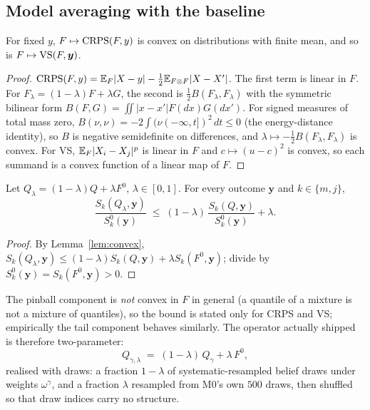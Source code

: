\subsection{Model averaging with the baseline}

\begin{lemma}\label{lem:convex}
For fixed $y$, $F\mapsto\operatorname{CRPS}(F,y)$ is convex on distributions with finite mean, and so is $F\mapsto\operatorname{VS}(F,\bm y)$.
\end{lemma}
\begin{proof}
$\operatorname{CRPS}(F,y)=\mathbb{E}_F|X-y|-\frac12\mathbb{E}_{F\otimes F}|X-X'|$. The first term is linear in $F$. For $F_\lambda=(1-\lambda)F+\lambda G$, the second is
$\frac12 B(F_\lambda,F_\lambda)$ with the symmetric bilinear form $B(F,G)=\iint|x-x'|F(dx)G(dx')$. For signed measures of total mass zero,
$B(\nu,\nu)=-2\int(\nu(-\infty,t])^2\,dt\le0$ (the energy-distance identity), so $B$ is negative semidefinite on differences, and
$\lambda\mapsto -\frac12B(F_\lambda,F_\lambda)$ is convex. For VS, $\mathbb{E}_{F}|X_i-X_j|^p$ is linear in $F$ and $c\mapsto(u-c)^2$ is convex, so each summand
is a convex function of a linear map of $F$.
\end{proof}

\begin{theorem}\label{thm:mix}
Let $Q_\lambda=(1-\lambda)Q+\lambda F^0$, $\lambda\in[0,1]$. For every outcome $\bm y$ and $k\in\{m,j\}$,
\begin{equation}
  \frac{S_k(Q_\lambda,\bm y)}{S^0_k(\bm y)} \;\le\; (1-\lambda)\,\frac{S_k(Q,\bm y)}{S^0_k(\bm y)}+\lambda .
\end{equation}
\end{theorem}
\begin{proof}
By Lemma~\ref{lem:convex}, $S_k(Q_\lambda,\bm y)\le(1-\lambda)S_k(Q,\bm y)+\lambda S_k(F^0,\bm y)$; divide by $S^0_k(\bm y)=S_k(F^0,\bm y)>0$.
\end{proof}
The pinball component is \emph{not} convex in $F$ in general (a quantile of a mixture is not a mixture of quantiles), so the bound is stated
only for CRPS and VS; empirically the tail component behaves similarly. The operator actually shipped is therefore two-parameter:
\begin{equation}\label{eq:action}
  Q_{\gamma,\lambda} \;=\; (1-\lambda)\,Q_\gamma + \lambda\,F^0 ,
\end{equation}
realised with draws: a fraction $1-\lambda$ of systematic-resampled belief draws under weights $\omega^\gamma$, and a fraction $\lambda$ resampled
from M0's own $500$ draws, then shuffled so that draw indices carry no structure.

